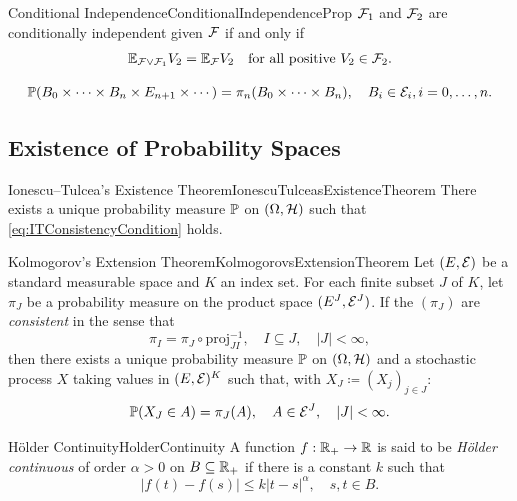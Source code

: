 \begin{prop}{Conditional Independence}{ConditionalIndependenceProp}
    $\mathcal{F}_1$ and $\mathcal{F}_2$ are conditionally independent given $\mathcal{F}$ if and only if
    \begin{equation}\label{eq:ConditionalIndependenceProp}
        \mathbb{E}_{\mathcal{F} \vee \mathcal{F}_1} V_2 = \mathbb{E}_{\mathcal{F}} V_2 \quad \text{for all positive } V_2 \in \mathcal{F}_2.
    \end{equation}
\end{prop}

\begin{equation}\label{eq:ITConsistencyCondition}
    \mathbb{P}(B_0 \times \cdots \times B_n \times E_{n+1} \times \cdots) = \pi_n(B_0 \times \cdots \times B_n), \quad B_i \in \mathcal{E}_i, i = 0, \dots, n.
\end{equation}

\subsection{Existence of Probability Spaces}


\begin{thm}{Ionescu--Tulcea's Existence Theorem}{IonescuTulceasExistenceTheorem}
    There exists a unique probability measure $\mathbb{P}$ on $(\Omega, \mathcal{H})$ such that \cref{eq:ITConsistencyCondition} holds.
\end{thm}

\begin{thm}{Kolmogorov's Extension Theorem}{KolmogorovsExtensionTheorem}
    Let $(E, \mathcal{E})$ be a standard measurable space and $K$ an index set. For each finite subset $J$ of $K$, let $\pi_J$ be a probability measure on the product space $(E^J, \mathcal{E}^J)$. If the $(\pi_J)$ are \emph{consistent} in the sense that
    \begin{equation*}
        \pi_I = \pi_J \circ \mathrm{proj}_{JI}^{-1}, \quad I \subseteq J, \quad |J| < \infty,
    \end{equation*}
    then there exists a unique probability measure $\mathbb{P}$ on $(\Omega, \mathcal{H})$ and a stochastic process $X$ taking values in $(E, \mathcal{E})^K$ such that, with $X_J \coloneqq (X_j)_{j \in J}$:
    \begin{equation*}
        \mathbb{P}(X_J \in A) = \pi_J(A), \quad A \in \mathcal{E}^J, \quad |J| < \infty.
    \end{equation*}
\end{thm}

\begin{defn}{Hölder Continuity}{HolderContinuity}
    A function $f : \mathbb{R}_+ \to \mathbb{R}$ is said to be \emph{Hölder continuous} of order $\alpha > 0$ on $B \subseteq \mathbb{R}_+$ if there is a constant $k$ such that
    \begin{equation*}
        |f(t) - f(s)| \leq k |t - s|^\alpha, \quad s, t \in B.
    \end{equation*}
\end{defn}

